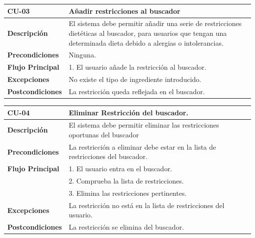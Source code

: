 \begin{table}[H]
\begin{tabular}{|m{3cm}|m{9cm}|}
\hline
\textbf{CU-03} & Añadir restricciones al buscador \\
\hline
\textbf{Descripción} & El sistema debe permitir añadir una serie de restricciones dietéticas al buscador, para usuarios que tengan una determinada dieta debido a alergias o intolerancias.\\
\hline
\textbf{Precondiciones} & Ninguna. \\
\hline
\textbf{Flujo Principal} & 
1. El usuario añade la restricción al buscador. \\
\hline
\textbf{Excepciones} & No existe el tipo de ingrediente introducido. \\
\hline
\textbf{Postcondiciones} & La restricción queda reflejada en el buscador.\\
\hline
\end{tabular}
\label{Tab:Cu-03}
\end{table}
\begin{table}[H]
\begin{tabular}{|m{3cm}|m{9cm}|}
\hline
\textbf{CU-04} & Eliminar Restricción del buscador. \\
\hline
\textbf{Descripción} & El sistema debe permitir eliminar las restricciones oportunas del buscador\\
\hline
\textbf{Precondiciones} & La restricción a eliminar debe estar en la lista de restricciones del buscador. \\
\hline
\textbf{Flujo Principal} & 
1. El usuario entra en el buscador. \\
& 2. Comprueba la lista de restricciones. \\
& 3. Elimina las restricciones pertinentes. \\
\hline
\textbf{Excepciones} & La restricción no está en la lista de restricciones del usuario. \\
\hline
\textbf{Postcondiciones} & La restricción se elimina del buscador.\\
\hline
\end{tabular}
\label{Tab:Cu-04}
\end{table}
